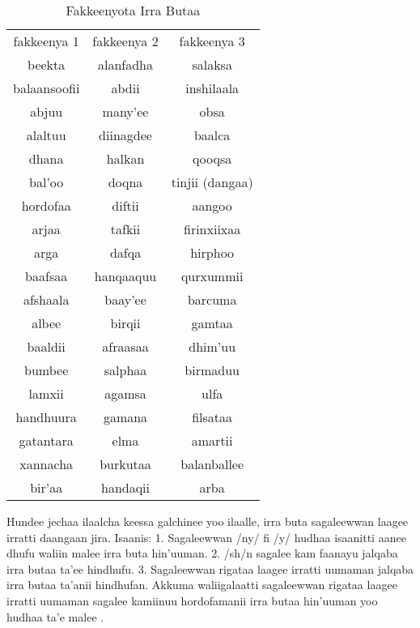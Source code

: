 \documentclass[11pt,b5paper]{book}
\begin{document}
\begin{table}[h!]
\caption{Fakkeenyota Irra Butaa}
\centering
\begin{tabular} {c c c} \\
  \hline\hline
  fakkeenya 1 & fakkeenya 2 & fakkeenya 3 \\
  beekta & alanfadha & salaksa \\
  balaansoofii & abdii & inshilaala \\
  abjuu & many'ee & obsa \\
  alaltuu & diinagdee & baalca \\
  dhana & halkan & qooqsa \\
  bal'oo & doqna & tinjii (dangaa)\\
  hordofaa & diftii & aangoo \\
  arjaa & tafkii & firinxiixaa \\
  arga & dafqa & hirphoo \\
  baafsaa & hanqaaquu & qurxummii \\
  afshaala & baay'ee & barcuma \\
  albee & birqii & gamtaa \\
  baaldii & afraasaa & dhim'uu \\
  bumbee & salphaa & birmaduu \\
  lamxii & agamsa & ulfa \\
  handhuura & gamana & filsataa \\
  gatantara & elma & amartii \\
  xannacha & burkutaa & balanballee \\
  bir'aa & handaqii & arba \\
\hline\hline
\end{tabular}
\end{table}

Hundee jechaa ilaalcha keessa galchinee yoo ilaalle, irra buta sagaleewwan laagee irratti daangaan jira. Isaanis: 1. Sagaleewwan /ny/ fi /y/ hudhaa isaanitti aanee dhufu waliin malee irra buta hin’uuman. 2. /sh/n sagalee kam faanayu jalqaba irra butaa ta’ee hindhufu. 3. Sagaleewwan rigataa laagee irratti uumaman jalqaba irra butaa ta’anii hindhufan. Akkuma waliigalaatti sagaleewwan rigataa laagee irratti uumaman sagalee kamiinuu hordofamanii irra butaa hin’uuman yoo hudhaa ta’e malee \cite{lloret1988gemination}.
\end{document}
